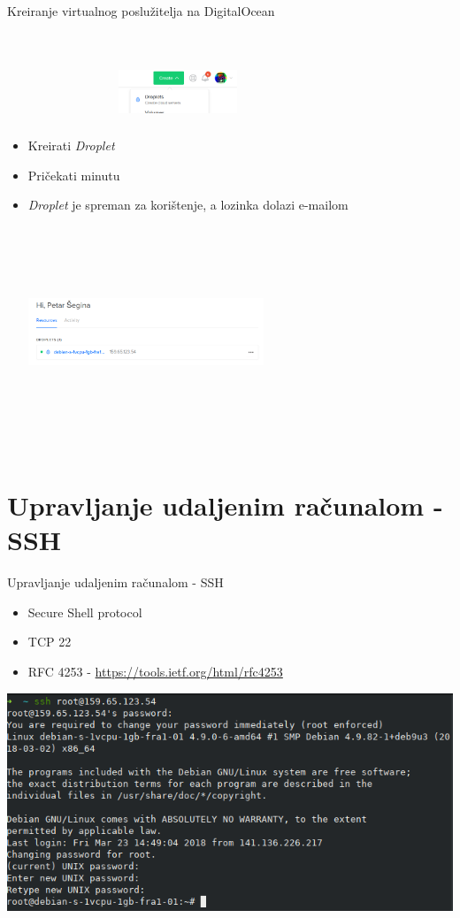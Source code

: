 \documentclass[t]{beamer}
\begin{document}
\begin{frame}{Kreiranje virtualnog poslužitelja na DigitalOcean}
    \begin{itemize}
        \item Kreirati \textit{Droplet}
        \includegraphics[width=100pt,height=100pt,keepaspectratio,left]{digital_ocean_create.png}
        \item Pričekati minutu
        \item \textit{Droplet} je spreman za korištenje, a lozinka dolazi e-mailom
        \includegraphics[width=200pt,height=200pt,keepaspectratio,left]{digital_ocean_dashboard.png}
    \end{itemize}
\end{frame}

\section{Upravljanje udaljenim računalom - SSH}

\begin{frame}{Upravljanje udaljenim računalom - SSH}
    \begin{itemize}
        \item Secure Shell protocol
        \item TCP 22
        \item RFC 4253 - \url{https://tools.ietf.org/html/rfc4253}
    \end{itemize}
    \includegraphics[width=\textwidth,keepaspectratio,center]{ssh.png}
\end{frame}
\end{document}

